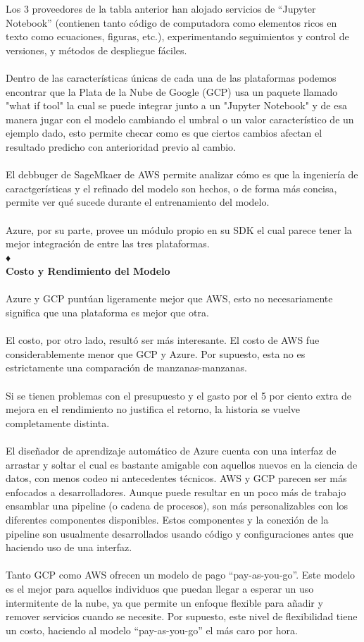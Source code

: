 \documentclass[12pt, a4paper, titlepage]{report}
\begin{document}
		Los 3 proveedores de la tabla anterior han alojado servicios de “Jupyter Notebook” (contienen tanto código de computadora como elementos ricos en texto como ecuaciones, figuras, etc.), experimentando seguimientos y control de versiones, y métodos de despliegue fáciles.\\
		\\
		Dentro de las características únicas de cada una de las plataformas podemos encontrar que la Plata de la Nube de Google (GCP) usa un paquete llamado "what if tool" la cual se puede integrar junto a un "Jupyter Notebook" y de esa manera jugar con el modelo cambiando el umbral o un valor característico de un ejemplo dado, esto permite checar como es que ciertos cambios afectan el resultado predicho con anterioridad previo al cambio.\\
		\\
		El debbuger de SageMkaer de AWS permite analizar cómo es que la ingeniería de caractgerísticas y el refinado del modelo son hechos, o de forma más concisa, permite ver qué sucede durante el entrenamiento del modelo.\\
		\\
		Azure, por su parte, provee un módulo propio en su SDK el cual parece tener la mejor integración de entre las tres plataformas.\\♦
		\\
		\textbf{Costo y Rendimiento del Modelo}\\
		\\
		Azure y GCP puntúan ligeramente mejor que AWS, esto no necesariamente significa que una plataforma es mejor que otra.\\
		\\
		El costo, por otro lado, resultó ser más interesante. El costo de AWS fue considerablemente menor que GCP y Azure. Por supuesto, esta no es estrictamente una comparación de manzanas-manzanas.\\
		\\
		Si se tienen problemas con el presupuesto y el gasto por el 5 por ciento extra de mejora en el rendimiento no justifica el retorno, la historia se vuelve completamente distinta.\\
		\\
		El diseñador de aprendizaje automático de Azure cuenta con una interfaz de arrastar y soltar el cual es bastante amigable con aquellos nuevos en la ciencia de datos, con menos codeo ni antecedentes técnicos. AWS y GCP parecen ser más enfocados a desarrolladores. Aunque puede resultar en un poco más de trabajo ensamblar una pipeline (o cadena de procesos), son más personalizables con los diferentes componentes disponibles. Estos componentes y la conexión de la pipeline son usualmente desarrollados usando código y configuraciones antes que haciendo uso de una interfaz.\\
		\\
		Tanto GCP como AWS ofrecen un modelo de pago “pay-as-you-go”. Este modelo es el mejor para aquellos individuos que puedan llegar a esperar un uso intermitente de la nube, ya que permite un enfoque flexible para añadir y remover servicios cuando se necesite. Por supuesto, este nivel de flexibilidad tiene un costo, haciendo al modelo “pay-as-you-go” el más caro por hora.
		
\end{document}
